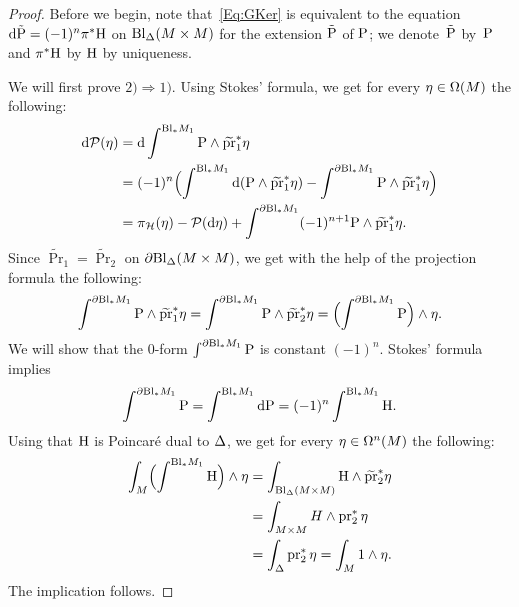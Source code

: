 \documentclass[\MainFolder/Text.tex]{subfiles}
\begin{document}
\begin{proof} %
Before we begin, note that~\eqref{Eq:GKer} is equivalent to the equation $\mathrm{d} \tilde{\mathrm{P}} = (-1)^n \pi^* \mathrm{H}$ on $\mathrm{Bl}_\Delta(M\times M)$ for the extension $\tilde{\mathrm{P}}$ of $\mathrm{P}$; we denote~$\tilde{\mathrm{P}}$ by~$\mathrm{P}$ and $\pi^*\mathrm{H}$ by $\mathrm{H}$ by uniqueness.

We will first prove $2) \Longrightarrow 1)$.
Using Stokes' formula, we get for every $\eta\in \Omega(M)$ the following:
%
\begin{equation*}
\begin{aligned}
  \mathrm{d} \mathcal{P} (\eta) &= \mathrm{d} \int^{\mathrm{Bl}_* M_1} \mathrm{P}\wedge \widetilde{\operatorname{\mathrm{pr}}}_1^* \eta \\ 
  &= (-1)^n \Bigl( \int^{\mathrm{Bl}_* M_1} \mathrm{d}(\mathrm{P}\wedge\widetilde{\operatorname{\mathrm{pr}}}_1^* \eta) - \int^{\partial \mathrm{Bl}_* M_1} \mathrm{P} \wedge \widetilde{\operatorname{\mathrm{pr}}}_1^* \eta \Bigr) \\ 
  &= \operatorname{\pi_{\mathcal{H}}}(\eta) - \mathcal{P}(\mathrm{d}\eta) +  \int^{\partial \mathrm{Bl}_* M_1} (-1)^{n+1}\mathrm{P}\wedge \widetilde{\operatorname{\mathrm{pr}}}_1^*\eta.
\end{aligned}
\end{equation*}
Since $\widetilde{\Pr}_1 = \widetilde{\Pr}_2$ on $\partial \mathrm{Bl}_\Delta (M\times M)$, we get with the help of the projection formula the following:
\begin{equation*}
 \int^{\partial \mathrm{Bl}_* M_1} \mathrm{P}\wedge \widetilde{\operatorname{\mathrm{pr}}}_1^*\eta  = \int^{\partial \mathrm{Bl}_* M_1} \mathrm{P}\wedge \widetilde{\operatorname{\mathrm{pr}}}_2^*\eta = \Bigl(\int^{\partial \mathrm{Bl}_* M_1} \mathrm{P} \Bigr)\wedge\eta.
\end{equation*}
We will show that the $0$-form $\int^{\partial \mathrm{Bl}_* M_1} \mathrm{P}$ is constant $(-1)^n$. Stokes' formula implies
\begin{equation*}
 \int^{\partial \mathrm{Bl}_* M_1} \mathrm{P} = \int^{\mathrm{Bl}_* M_1} \mathrm{d} \mathrm{P} = (-1)^n \int^{\mathrm{Bl}_* M_1} \mathrm{H}. 
\end{equation*}
Using that $\mathrm{H}$ is Poincar\'e dual to $\Delta$, we get for every $\eta\in \Omega^n(M)$ the following:
%
\begin{equation*}
\begin{aligned}
 \int_M \Bigl(\int^{\mathrm{Bl}_* M_1} \mathrm{H} \Bigr) \wedge \eta &= \int_{\mathrm{Bl}_\Delta(M\times M)} \mathrm{H}\wedge \widetilde{\operatorname{\mathrm{pr}}}_2^*\eta 
 \\ &= \int_{M\times M} H\wedge \operatorname{\mathrm{pr}}_2^*\eta  \\ &= \int_\Delta \operatorname{\mathrm{pr}}_2^*\eta  = \int_M 1\wedge \eta.
\end{aligned}
\end{equation*}
The implication follows.


\end{proof}
\end{document}
